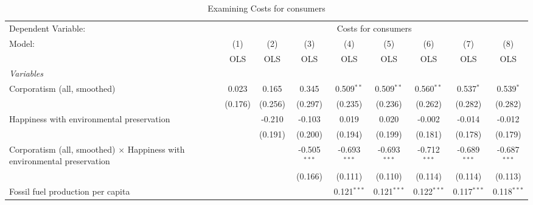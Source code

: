 
\begin{table}[htbp]
   \caption{Examining Costs for consumers}
   \centering
   \begin{tabular}{lcccccccc}
      \toprule
      Dependent Variable: & \multicolumn{8}{c}{Costs for consumers}\\
      Model:                                                                          & (1)     & (2)     & (3)            & (4)            & (5)            & (6)            & (7)            & (8)\\  
                                                                                      &  OLS    & OLS     & OLS            & OLS            & OLS            & OLS            & OLS            & OLS\\  
      \midrule
      \emph{Variables}\\
      Corporatism (all, smoothed)                                                     & 0.023   & 0.165   & 0.345          & 0.509$^{**}$   & 0.509$^{**}$   & 0.560$^{**}$   & 0.537$^{*}$    & 0.539$^{*}$\\   
                                                                                      & (0.176) & (0.256) & (0.297)        & (0.235)        & (0.236)        & (0.262)        & (0.282)        & (0.282)\\   
      Happiness with environmental preservation                                       &         & -0.210  & -0.103         & 0.019          & 0.020          & -0.002         & -0.014         & -0.012\\   
                                                                                      &         & (0.191) & (0.200)        & (0.194)        & (0.199)        & (0.181)        & (0.178)        & (0.179)\\   
      Corporatism (all, smoothed) $\times$ Happiness with environmental preservation  &         &         & -0.505$^{***}$ & -0.693$^{***}$ & -0.693$^{***}$ & -0.712$^{***}$ & -0.689$^{***}$ & -0.687$^{***}$\\   
                                                                                      &         &         & (0.166)        & (0.111)        & (0.110)        & (0.114)        & (0.114)        & (0.113)\\   
      Fossil fuel production per capita                                               &         &         &                & 0.121$^{***}$  & 0.121$^{***}$  & 0.122$^{***}$  & 0.117$^{***}$  & 0.118$^{***}$\\   

\end{tabular}
\end{table}
